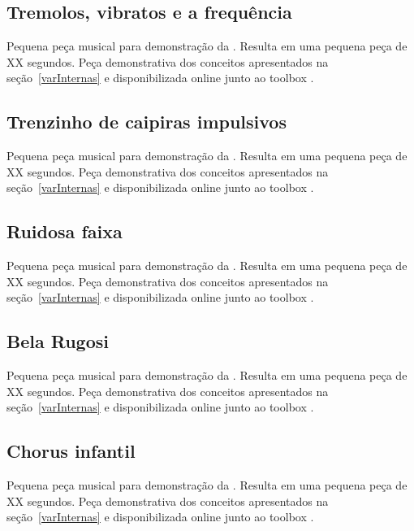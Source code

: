 \subsection{Tremolos, vibratos e a frequência}\label{ap:tremolos}
Pequena peça musical para demonstração da . Resulta em uma pequena peça de XX segundos. Peça demonstrativa dos conceitos apresentados na seção~\ref{varInternas} e disponibilizada online junto ao toolbox \massa.



\subsection{Trenzinho de caipiras impulsivos}\label{ap:trenzinho}
Pequena peça musical para demonstração da . Resulta em uma pequena peça de XX segundos. Peça demonstrativa dos conceitos apresentados na seção~\ref{varInternas} e disponibilizada online junto ao toolbox \massa.



\subsection{Ruidosa faixa}\label{ap:ruidosa}
Pequena peça musical para demonstração da . Resulta em uma pequena peça de XX segundos. Peça demonstrativa dos conceitos apresentados na seção~\ref{varInternas} e disponibilizada online junto ao toolbox \massa.



\subsection{Bela Rugosi}\label{ap:bela}
Pequena peça musical para demonstração da . Resulta em uma pequena peça de XX segundos. Peça demonstrativa dos conceitos apresentados na seção~\ref{varInternas} e disponibilizada online junto ao toolbox \massa.



\subsection{Chorus infantil}\label{ap:chorus}
Pequena peça musical para demonstração da . Resulta em uma pequena peça de XX segundos. Peça demonstrativa dos conceitos apresentados na seção~\ref{varInternas} e disponibilizada online junto ao toolbox \massa.



